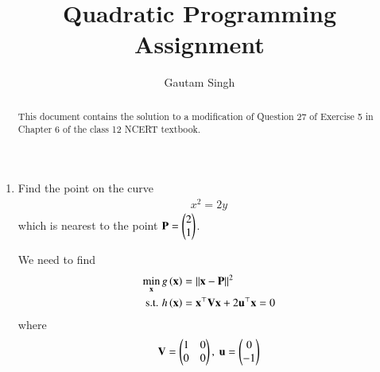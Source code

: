 \documentclass[journal,12pt,twocolumn]{IEEEtran}
\renewcommand{\vec}[1]{\boldsymbol{\mathbf{#1}}}
\begin{document}
\vspace{3cm}
\title{Quadratic Programming Assignment}
\author{Gautam Singh}
\maketitle
\bigskip

\begin{abstract}
    This document contains the solution to a modification of Question 27 of 
    Exercise 5 in Chapter 6 of the class 12 NCERT textbook.
\end{abstract}

\begin{enumerate}
    \item Find the point on the curve 
    \begin{align}
        x^2 = 2y
        \label{eq:curve}
    \end{align}
    which is nearest to the point $\vec{P} = \myvec{2\\1}$.

    \solution We need to find
    \begin{align}
        \min_{\vec{x}} g\brak{\vec{x}} &= \norm{\vec{x}-\vec{P}}^2 \label{eq:cost} \\
        \textrm{s.t. } h\brak{\vec{x}} &= \vec{x}^\top\vec{Vx} + 2\vec{u}^\top\vec{x} = 0 \label{eq:constr}
    \end{align}
    where
    \begin{align}
        \vec{V} = \myvec{1&0\\0&0},\ \vec{u} = \myvec{0\\-1}
    \end{align}


\end{enumerate}
\end{document}
